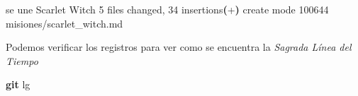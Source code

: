 \documentclass[
]{book}
\newenvironment{Shaded}{\begin{snugshade}}{\end{snugshade}}
\newcommand{\ErrorTok}[1]{\textcolor[rgb]{0.64,0.00,0.00}{\textbf{#1}}}
\newcommand{\ExtensionTok}[1]{#1}
\newcommand{\FunctionTok}[1]{\textcolor[rgb]{0.13,0.29,0.53}{\textbf{#1}}}
\newcommand{\KeywordTok}[1]{\textcolor[rgb]{0.13,0.29,0.53}{\textbf{#1}}}
\newcommand{\NormalTok}[1]{#1}
\begin{document}
\begin{Shaded}
\begin{Highlighting}[]
\ExtensionTok{[main}\NormalTok{ 5ae8eb6] se une Scarlet Witch}
 \ExtensionTok{5}\NormalTok{ files changed, 34 insertions}\ErrorTok{(}\ExtensionTok{+}\KeywordTok{)}
 \ExtensionTok{create}\NormalTok{ mode 100644 misiones/scarlet\_witch.md}
\end{Highlighting}
\end{Shaded}

Podemos verificar los registros para ver como se encuentra la \emph{Sagrada Línea del Tiempo}

\begin{Shaded}
\begin{Highlighting}[]
\FunctionTok{git}\NormalTok{ lg}
\end{Highlighting}
\end{Shaded}
\end{document}
